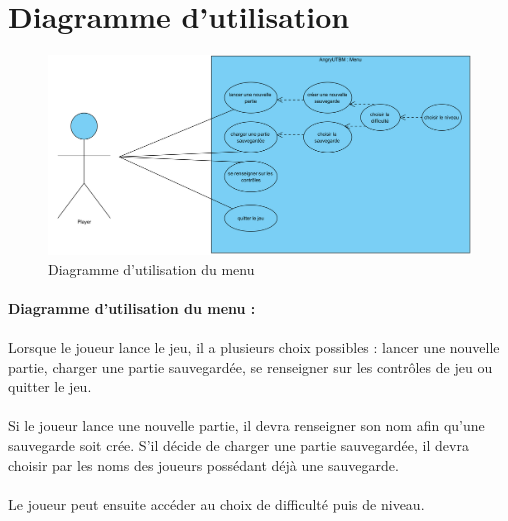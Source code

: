 \documentclass[a4paper,12pt]{report}
\begin{document}
\section{Diagramme d'utilisation}

\begin{figure}[H]
\begin{center}
\includegraphics[scale=0.2]{images/UseCase1.png} 
\end{center}
\caption{Diagramme d'utilisation du menu}
\label{Diagramme d'utilisation du menu}
\end{figure}

\paragraph{Diagramme d'utilisation du menu :}

\paragraph{}Lorsque le joueur lance le jeu, il a plusieurs choix possibles : lancer une nouvelle partie, charger une partie sauvegardée, se renseigner sur les contrôles de jeu ou quitter le jeu.
\paragraph{}Si le joueur lance une nouvelle partie, il devra renseigner son nom afin qu'une sauvegarde soit crée. S'il décide de charger une partie sauvegardée, il devra choisir par les noms des joueurs possédant déjà une sauvegarde.
\paragraph{}Le joueur peut ensuite accéder au choix de difficulté puis de niveau.
\end{document}
